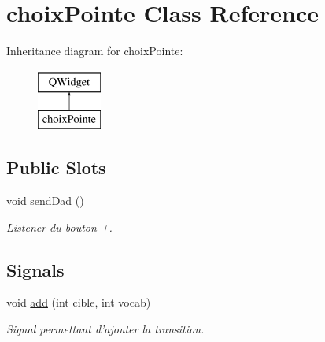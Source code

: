 \hypertarget{classchoix_pointe}{\section{choix\-Pointe Class Reference}
\label{classchoix_pointe}
}
Inheritance diagram for choix\-Pointe\-:\begin{figure}[H]
\begin{center}
\leavevmode
\includegraphics[height=2.000000cm]{classchoix_pointe}
\end{center}
\end{figure}
\subsection*{Public Slots}
\begin{DoxyCompactItemize}
\item 
void \hyperlink{classchoix_pointe_ac8ccad58270933a4950d5c6e2cc74168}{send\-Dad} ()
\begin{DoxyCompactList}\small\item\em Listener du bouton +. \end{DoxyCompactList}\end{DoxyCompactItemize}
\subsection*{Signals}
\begin{DoxyCompactItemize}
\item 
\hypertarget{classchoix_pointe_a586763c92b709e2e5d0b27c412e62ec2}{void \hyperlink{classchoix_pointe_a586763c92b709e2e5d0b27c412e62ec2}{add} (int cible, int vocab)}\label{classchoix_pointe_a586763c92b709e2e5d0b27c412e62ec2}

\begin{DoxyCompactList}\small\item\em Signal permettant d'ajouter la transition. \end{DoxyCompactList}\end{DoxyCompactItemize}
